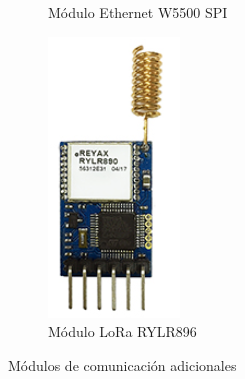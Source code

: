 \begin{figure}[h!]
\begin{subfigure}[b]{0.2\linewidth}
	\caption{Módulo Ethernet W5500 SPI}
	\label{fig:w5500}
\end{subfigure}\hspace{15mm}
\begin{subfigure}[b]{0.15\linewidth}
	\includegraphics[width=\linewidth]{./Figures/RYLR.png}
	\caption{Módulo LoRa RYLR896}
	\label{fig:RYLR}
\end{subfigure}
\caption{Módulos de comunicación adicionales}
\label{fig:ESP32}
\end{figure}

